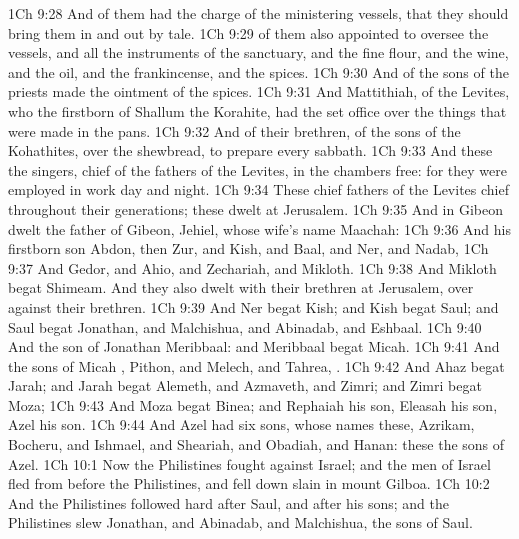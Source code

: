 \vs 1Ch 9:28 And  of them had the charge of the ministering vessels, that they should bring them in and out by tale.
\vs 1Ch 9:29  of them also  appointed to oversee the vessels, and all the instruments of the sanctuary, and the fine flour, and the wine, and the oil, and the frankincense, and the spices.
\vs 1Ch 9:30 And  of the sons of the priests made the ointment of the spices.
\vs 1Ch 9:31 And Mattithiah,  of the Levites, who  the firstborn of Shallum the Korahite, had the set office over the things that were made in the pans.
\vs 1Ch 9:32 And  of their brethren, of the sons of the Kohathites,  over the shewbread, to prepare  every sabbath.
\vs 1Ch 9:33 And these  the singers, chief of the fathers of the Levites,  in the chambers  free: for they were employed in  work day and night.
\vs 1Ch 9:34 These chief fathers of the Levites  chief throughout their generations; these dwelt at Jerusalem.
\vs 1Ch 9:35 And in Gibeon dwelt the father of Gibeon, Jehiel, whose wife's name  Maachah:
\vs 1Ch 9:36 And his firstborn son Abdon, then Zur, and Kish, and Baal, and Ner, and Nadab,
\vs 1Ch 9:37 And Gedor, and Ahio, and Zechariah, and Mikloth.
\vs 1Ch 9:38 And Mikloth begat Shimeam. And they also dwelt with their brethren at Jerusalem, over against their brethren.
\vs 1Ch 9:39 And Ner begat Kish; and Kish begat Saul; and Saul begat Jonathan, and Malchishua, and Abinadab, and Eshbaal.
\vs 1Ch 9:40 And the son of Jonathan  Meribbaal: and Meribbaal begat Micah.
\vs 1Ch 9:41 And the sons of Micah , Pithon, and Melech, and Tahrea, .
\vs 1Ch 9:42 And Ahaz begat Jarah; and Jarah begat Alemeth, and Azmaveth, and Zimri; and Zimri begat Moza;
\vs 1Ch 9:43 And Moza begat Binea; and Rephaiah his son, Eleasah his son, Azel his son.
\vs 1Ch 9:44 And Azel had six sons, whose names  these, Azrikam, Bocheru, and Ishmael, and Sheariah, and Obadiah, and Hanan: these  the sons of Azel.
\vs 1Ch 10:1 Now the Philistines fought against Israel; and the men of Israel fled from before the Philistines, and fell down slain in mount Gilboa.
\vs 1Ch 10:2 And the Philistines followed hard after Saul, and after his sons; and the Philistines slew Jonathan, and Abinadab, and Malchishua, the sons of Saul.
